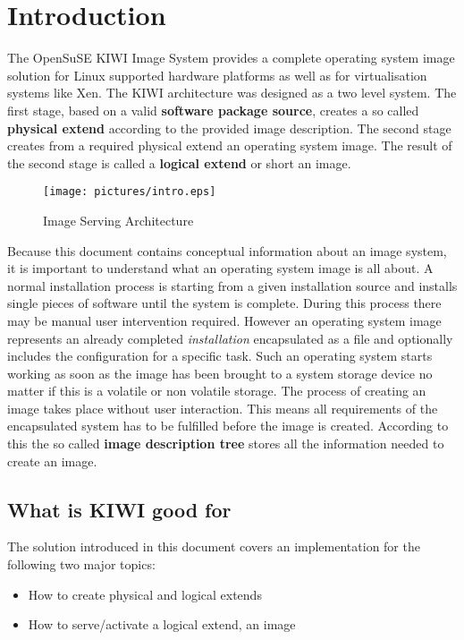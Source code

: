 \chapter{Introduction}

The OpenSuSE KIWI Image System provides a complete operating system
image solution for Linux supported hardware platforms as well as
for virtualisation systems like Xen. The KIWI architecture was designed
as a two level system. The first stage, based on a valid
\textbf{software package source}, creates a so called \textbf{physical extend}
according to the provided image description. The second stage creates from
a required physical extend an operating system image. The result of the
second stage is called a \textbf{logical extend} or short an image.

\begin{figure}[h]
\centering
\texttt{[image: pictures/intro.eps]}
\caption{Image Serving Architecture}
\label{fig:architecture}
\end{figure}

Because this document contains conceptual information about an image system,
it is important to understand what an operating system image is all about.
A normal installation process is starting from a given installation source
and installs single pieces of software until the system is complete. During
this process there may be manual user intervention required. However an
operating system image represents an already completed \textit{installation}
encapsulated as a file and optionally includes the configuration for a
specific task. Such an operating system starts working as soon as the
image has been brought to a system storage device no matter if this is a
volatile or non volatile storage. The process of creating an image takes
place without user interaction.
This means all requirements of the encapsulated system has to be fulfilled
before the image is created. According to this the so called
\textbf{image description tree} stores all the information needed to
create an image.


\section{What is KIWI good for}
The solution introduced in this document covers an implementation
for the following two major topics:

\begin{itemize}
	\item How to create physical and logical extends
	\item How to serve/activate a logical extend, an image
\end{itemize}

